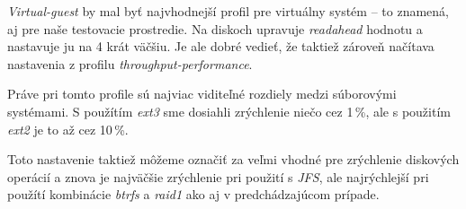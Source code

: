 \emph{Virtual-guest} by mal byť najvhodnejší profil pre virtuálny systém -- to
znamená, aj pre naše testovacie prostredie. Na diskoch upravuje
\emph{readahead} hodnotu a nastavuje ju na 4 krát väčšiu. Je ale dobré vedieť,
že taktiež zároveň načítava nastavenia z profilu \emph{throughput-performance}.

Práve pri tomto profile sú najviac viditeľné rozdiely medzi súborovými
systémami. S použítím \emph{ext3} sme dosiahli zrýchlenie niečo cez 1\,\%, ale s
použitím \emph{ext2} je to až cez 10\,\%.

Toto nastavenie taktiež môžeme označiť za veľmi vhodné pre zrýchlenie diskových
operácií a znova je najväčšie zrýchlenie pri použití s \emph{JFS}, ale
najrýchlejší pri použítí kombinácie \emph{btrfs} a \emph{raid1} ako aj v
predchádzajúcom prípade. 
